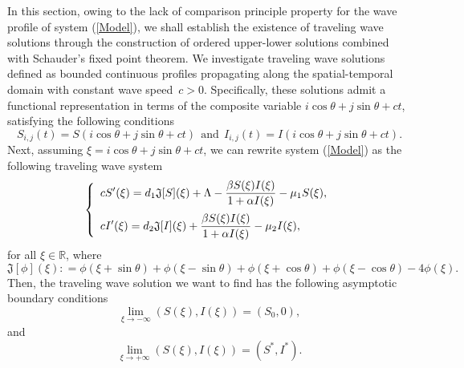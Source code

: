 \documentclass[final,3p,times]{elsarticle}
\numberwithin{equation}{section}
\begin{document}
In this section, owing to the lack of comparison principle property for the wave profile of system (\ref{Model}), we shall establish the existence of traveling wave solutions through the construction of ordered upper-lower solutions combined with Schauder's fixed point theorem. We investigate traveling wave solutions defined as bounded continuous profiles propagating along the spatial-temporal domain with constant wave speed~$c > 0$. Specifically, these solutions admit a functional representation in terms of the composite variable $i \cos\theta + j \sin \theta + ct$, satisfying the following conditions
\begin{equation}\label{dy2.1}
S_{i,j}(t)=S(i \cos\theta + j \sin \theta + ct)~~\mathrm{and}~~I_{i,j}(t)=I(i \cos\theta + j \sin \theta + ct).
\end{equation}
Next, assuming $\xi = i \cos\theta + j \sin \theta + ct$, we can rewrite system (\ref{Model}) as the following traveling wave system
\begin{equation}
\label{WaveEqu}\left\{
\begin{array}{l}
\vspace{2mm}
\displaystyle   c S'(\xi) =
d_1\mathfrak{J}[S](\xi) + \Lambda - \frac{\beta S(\xi)I(\xi)}{1+\alpha I(\xi)} - \mu_1 S(\xi),\\
\displaystyle   c I'(\xi) =
d_2\mathfrak{J}[I](\xi) + \frac{\beta S(\xi)I(\xi)}{1+\alpha I(\xi)} - \mu_2 I(\xi),
\end{array}\right.
\end{equation}
for all \(\xi\in\mathbb{R}\), where
\[
\mathfrak{J}[\phi](\xi) : = \phi(\xi + \sin\theta) + \phi(\xi - \sin\theta) + \phi(\xi + \cos\theta) + \phi(\xi - \cos\theta) - 4\phi(\xi).
\]
Then, the traveling wave solution we want to find has the following asymptotic boundary conditions
\begin{equation}\label{bj1}
\underset{\xi\rightarrow -\infty}{\lim}(S(\xi), I(\xi))=(S_{0},0),
\end{equation}
and
\begin{equation}\label{bj2}
\underset{\xi\rightarrow +\infty}{\lim}(S(\xi), I(\xi))=(S^{\ast},I^{\ast}).
\end{equation}
\end{document}
